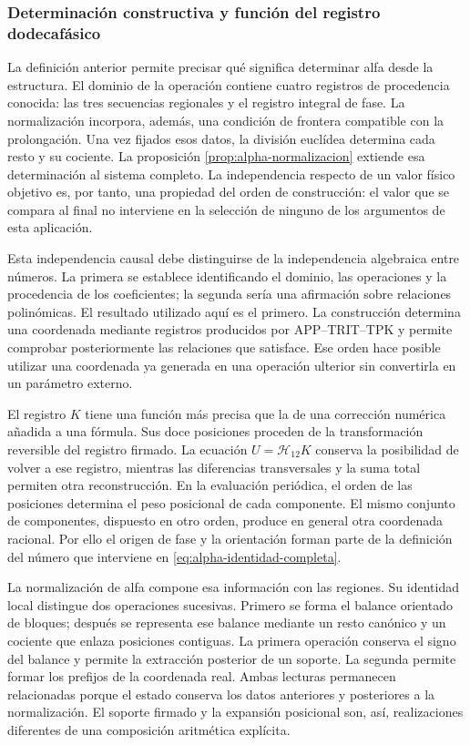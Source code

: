 \subsubsection{Determinación constructiva y función del registro dodecafásico}
\label{alpha-ampl-dependencias}

La definición anterior permite precisar qué significa determinar alfa desde
la estructura. El dominio de la operación contiene cuatro registros de
procedencia conocida: las tres secuencias regionales y el registro integral
de fase. La normalización incorpora, además, una condición de frontera
compatible con la prolongación. Una vez fijados esos datos, la división
euclídea determina cada resto y su cociente. La proposición
\ref{prop:alpha-normalizacion} extiende esa determinación al sistema
completo. La independencia respecto de un valor físico objetivo es, por
tanto, una propiedad del orden de construcción: el valor que se compara al
final no interviene en la selección de ninguno de los argumentos de esta
aplicación.

Esta independencia causal debe distinguirse de la independencia algebraica
entre números. La primera se establece identificando el dominio, las
operaciones y la procedencia de los coeficientes; la segunda sería una
afirmación sobre relaciones polinómicas. El resultado utilizado aquí es el
primero. La construcción determina una coordenada mediante registros
producidos por APP--TRIT--TPK y permite comprobar posteriormente las
relaciones que satisface. Ese orden hace posible utilizar una coordenada ya
generada en una operación ulterior sin convertirla en un parámetro externo.

El registro $K$ tiene una función más precisa que la de una corrección
numérica añadida a una fórmula. Sus doce posiciones proceden de la
transformación reversible del registro firmado. La ecuación
$U=\mathcal H_{12}K$ conserva la posibilidad de volver a ese registro,
mientras las diferencias transversales y la suma total permiten otra
reconstrucción. En la evaluación periódica, el orden de las posiciones
determina el peso posicional de cada componente. El mismo conjunto de
componentes, dispuesto en otro orden, produce en general otra coordenada
racional. Por ello el origen de fase y la orientación forman parte de la
definición del número que interviene en \eqref{eq:alpha-identidad-completa}.

La normalización de alfa compone esa información con las regiones. Su
identidad local distingue dos operaciones sucesivas. Primero se forma el
balance orientado de bloques; después se representa ese balance mediante
un resto canónico y un cociente que enlaza posiciones contiguas. La primera
operación conserva el signo del balance y permite la extracción posterior
de un soporte. La segunda permite formar los prefijos de la coordenada
real. Ambas lecturas permanecen relacionadas porque el estado conserva los
datos anteriores y posteriores a la normalización. El soporte firmado y la
expansión posicional son, así, realizaciones diferentes de una composición
aritmética explícita.


